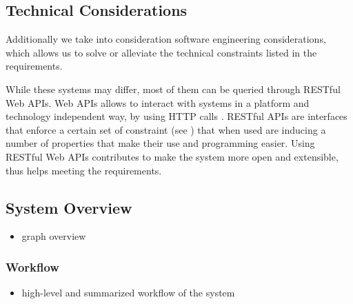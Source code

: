 \subsection{Technical Considerations}

Additionally we take into consideration software engineering considerations, which allows us to solve or alleviate the technical constraints listed in the requirements.



    


While these systems may differ, most of them can be queried through RESTful Web APIs.
Web APIs allows to interact with systems in a platform and technology independent way, by using HTTP calls \cite{todo}.
RESTful APIs are interfaces that enforce a certain set of constraint (see \cite{todo}) that when used are inducing a number of properties that make their use and programming easier.
Using RESTful Web APIs contributes to make the system more open and extensible, thus helps meeting the requirements.



\subsection{System Overview}
\begin{itemize}
    \item graph overview
\end{itemize}


\subsubsection*{Workflow}
\begin{itemize}
    \item high-level and summarized workflow of the system
\end{itemize}
